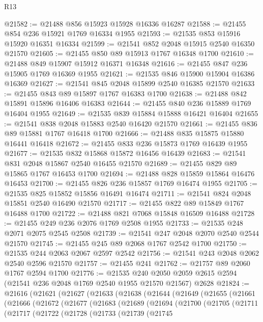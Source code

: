 \begin{lexlean}{R13}
\begin{coremodule}
@21582 := @21488 @856 @15923 @15928 @16336 @16287
@21588 := @21455 @854 @236 @15921 @1769 @16334 @1955
@21593 := @21535 @853 @15916 @15920 @16351 @16334
@21599 := @21541 @852 @2048 @15915 @2540 @16350 @21570
@21605 := @21455 @850 @89 @15913 @1767 @16348 @1700
@21610 := @21488 @849 @15907 @15912 @16371 @16348
@21616 := @21455 @847 @236 @15905 @1769 @16369 @1955
@21621 := @21535 @846 @15900 @15904 @16386 @16369
@21627 := @21541 @845 @2048 @15899 @2540 @16385 @21570
@21633 := @21455 @843 @89 @15897 @1767 @16383 @1700
@21638 := @21488 @842 @15891 @15896 @16406 @16383
@21644 := @21455 @840 @236 @15889 @1769 @16404 @1955
@21649 := @21535 @839 @15884 @15888 @16421 @16404
@21655 := @21541 @838 @2048 @15883 @2540 @16420 @21570
@21661 := @21455 @836 @89 @15881 @1767 @16418 @1700
@21666 := @21488 @835 @15875 @15880 @16441 @16418
@21672 := @21455 @833 @236 @15873 @1769 @16439 @1955
@21677 := @21535 @832 @15868 @15872 @16456 @16439
@21683 := @21541 @831 @2048 @15867 @2540 @16455 @21570
@21689 := @21455 @829 @89 @15865 @1767 @16453 @1700
@21694 := @21488 @828 @15859 @15864 @16476 @16453
@21700 := @21455 @826 @236 @15857 @1769 @16474 @1955
@21705 := @21535 @825 @15852 @15856 @16491 @16474
@21711 := @21541 @824 @2048 @15851 @2540 @16490 @21570
@21717 := @21455 @822 @89 @15849 @1767 @16488 @1700
@21722 := @21488 @821 @7068 @15848 @16509 @16488
@21728 := @21455 @249 @236 @2076 @1769 @2508 @1955
@21733 := @21535 @248 @2071 @2075 @2545 @2508
@21739 := @21541 @247 @2048 @2070 @2540 @2544 @21570
@21745 := @21455 @245 @89 @2068 @1767 @2542 @1700
@21750 := @21535 @244 @2063 @2067 @2597 @2542
@21756 := @21541 @243 @2048 @2062 @2540 @2596 @21570
@21757 := @21455 @241
@21762 := @21757 @89 @2060 @1767 @2594 @1700
@21776 := @21535
    @240
    @2050
    @2059
    @2615
    @2594
    (@21541 @236 @2048 @1769 @2540 @1955 @21570 @21567)
    @2628
@21824 := @21616
    (@21621
      (@21627
        (@21633
          (@21638
            (@21644
              (@21649
                (@21655
                  (@21661
                    (@21666
                      (@21672
                        (@21677
                          (@21683
                            (@21689
                              (@21694
                                (@21700
                                  (@21705
                                    (@21711
                                      (@21717
                                        (@21722
                                          (@21728
                                            (@21733
                                              (@21739
                                                (@21745

\end{coremodule}
\end{lexlean}
